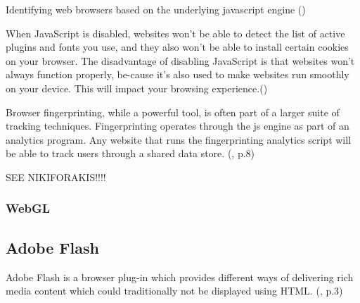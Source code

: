 Identifying web browsers based on the underlying javascript engine
(\textcite{mulazzani13})

When JavaScript is disabled, websites won’t be able to detect the list of active plugins and fonts you use, and they also won’t be able to install certain cookies on your browser.
The disadvantage of disabling JavaScript is that websites won’t always function properly, be-cause it’s also used to make websites run smoothly on your device. This will impact your browsing experience.(\textcite{pixel18})

Browser fingerprinting, while a powerful tool, is often part of a larger suite of tracking techniques. Fingerprinting operates through the js engine as part of an analytics program. Any website that runs the fingerprinting analytics script will be able to track users through a shared data store.
(\textcite{havens16}, p.8)

SEE NIKIFORAKIS!!!!


\subsubsection{WebGL}


\subsection{Adobe Flash}
Adobe Flash is a browser plug-in which provides different ways of delivering rich media content which could traditionally not be displayed using HTML. (\textcite{nikiforakis13}, p.3)


